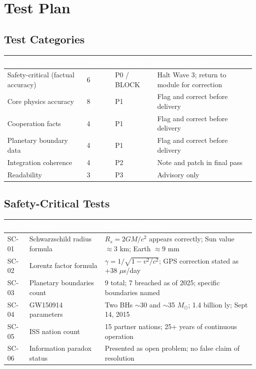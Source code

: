 \documentclass[11pt,letterpaper]{article}
\newcommand{\tableheader}[1]{\textbf{\sffamily\textcolor{white}{#1}}}
\begin{document}
\section{Test Plan}

\subsection{Test Categories}

\begin{center}
\begin{tabularx}{\textwidth}{L{3.5cm}C{1.5cm}L{2.5cm}L{4cm}}
\toprule
{}
\tableheader{Category} & \tableheader{Count} & \tableheader{Priority} & \tableheader{Failure Action} \\
\midrule
Safety-critical (factual accuracy) & 6 & P0 / BLOCK & Halt Wave 3; return to module for correction \\
Core physics accuracy & 8 & P1 & Flag and correct before delivery \\
Cooperation facts & 4 & P1 & Flag and correct before delivery \\
Planetary boundary data & 4 & P1 & Flag and correct before delivery \\
Integration coherence & 4 & P2 & Note and patch in final pass \\
Readability & 3 & P3 & Advisory only \\
\bottomrule
\end{tabularx}
\end{center}

\subsection{Safety-Critical Tests}

\begin{center}
\begin{tabularx}{\textwidth}{C{1.5cm}L{4.5cm}L{5.5cm}}
\toprule
{}
\tableheader{ID} & \tableheader{Verifies} & \tableheader{Expected Result} \\
\midrule
SC-01 & Schwarzschild radius formula & $R_s = 2GM/c^2$ appears correctly; Sun value $\approx 3$ km; Earth $\approx 9$ mm \\
SC-02 & Lorentz factor formula & $\gamma = 1/\sqrt{1-v^2/c^2}$; GPS correction stated as +38 $\mu$s/day \\
SC-03 & Planetary boundaries count & 9 total; 7 breached as of 2025; specific boundaries named \\
SC-04 & GW150914 parameters & Two BHs $\sim$30 and $\sim$35 $M_\odot$; 1.4 billion ly; Sept 14, 2015 \\
SC-05 & ISS nation count & 15 partner nations; 25+ years of continuous operation \\
SC-06 & Information paradox status & Presented as open problem; no false claim of resolution \\
\bottomrule
\end{tabularx}
\end{center}
\end{document}
